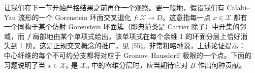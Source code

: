 
让我们在下一节开始严格结果之前再作一个观察。更一般地，假设我们有 Calabi--Yau 流形的一个 Gorenstein 环面交叉退化 $f:\mathcal{X}\to D$。这意指每一点 $x\in\mathcal{X}$ 都有一个同构于某个仿射 Gorenstein 环面簇（即典范类是 Cartier 除子）中开集的邻域，而 $f$ 局部地由某个单项式给出，该单项式在每个余维 1 的环面分层上恰好消失到 1 阶。这是正规交叉概念的推广，见 [55]。非常粗略地说，上述论证提示：中心纤维的每个不可约分支都将对应于 Gromov--Hausdorff 极限的一个点。下面的习题说明了当 $x\in\mathcal{X}_0$ 是 $\mathcal{X}_0$ 中的零维分层时，应当期待它对 $B$ 作出何种贡献。

